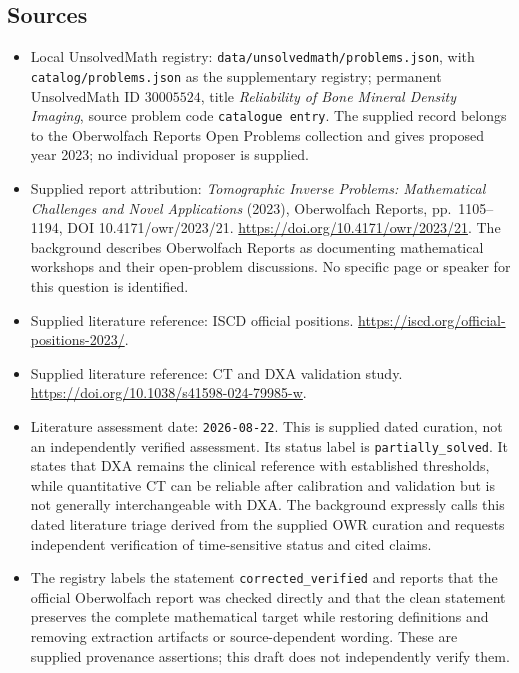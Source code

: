 \documentclass[11pt]{article}
\begin{document}
\subsection{Sources}
\begin{itemize}
\item Local UnsolvedMath registry: \texttt{data/unsolvedmath/problems.json}, with \texttt{catalog/problems.json} as the supplementary registry; permanent UnsolvedMath ID \(30005524\), title \emph{Reliability of Bone Mineral Density Imaging}, source problem code \texttt{catalogue entry}. The supplied record belongs to the Oberwolfach Reports Open Problems collection and gives proposed year 2023; no individual proposer is supplied.
\item Supplied report attribution: \emph{Tomographic Inverse Problems: Mathematical Challenges and Novel Applications} (2023), Oberwolfach Reports, pp.\ 1105--1194, DOI 10.4171/owr/2023/21. \url{https://doi.org/10.4171/owr/2023/21}. The background describes Oberwolfach Reports as documenting mathematical workshops and their open-problem discussions. No specific page or speaker for this question is identified.
\item Supplied literature reference: ISCD official positions. \url{https://iscd.org/official-positions-2023/}.
\item Supplied literature reference: CT and DXA validation study. \url{https://doi.org/10.1038/s41598-024-79985-w}.
\item Literature assessment date: \texttt{2026-08-22}. This is supplied dated curation, not an independently verified assessment. Its status label is \texttt{partially\_solved}. It states that DXA remains the clinical reference with established thresholds, while quantitative CT can be reliable after calibration and validation but is not generally interchangeable with DXA. The background expressly calls this dated literature triage derived from the supplied OWR curation and requests independent verification of time-sensitive status and cited claims.
\item The registry labels the statement \texttt{corrected\_verified} and reports that the official Oberwolfach report was checked directly and that the clean statement preserves the complete mathematical target while restoring definitions and removing extraction artifacts or source-dependent wording. These are supplied provenance assertions; this draft does not independently verify them.
\end{itemize}
\end{document}
